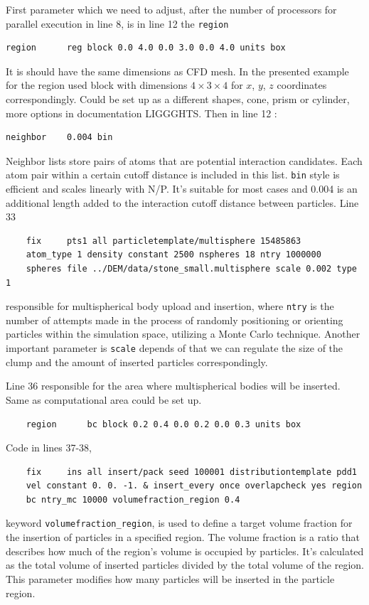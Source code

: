 First parameter which we need to adjust, after the number of processors for parallel execution in line 8, is in line 12 the  \texttt{region}
\begin{verbatim}
region		reg block 0.0 4.0 0.0 3.0 0.0 4.0 units box
\end{verbatim}
It is should have the same dimensions as CFD mesh. In the presented example for the region used block with dimensions $4 \times 3 \times 4$ for $x$, $y$, $z$ coordinates correspondingly. Could be set up as a different shapes, cone, prism or cylinder, more options in documentation LIGGGHTS. Then in line 12 :
\begin{verbatim}
neighbor	0.004 bin
\end{verbatim}
Neighbor lists store pairs of atoms that are potential interaction candidates. Each atom pair within a certain cutoff distance is included in this list. \texttt{bin} style is efficient and scales linearly with N/P. It's suitable for most cases and 0.004 is an additional length added to the interaction cutoff distance between particles. Line 33 
\begin{verbatim}
    fix		pts1 all particletemplate/multisphere 15485863 
    atom_type 1 density constant 2500 nspheres 18 ntry 1000000
    spheres file ../DEM/data/stone_small.multisphere scale 0.002 type 1
\end{verbatim}
responsible for multispherical body upload and insertion, where \verb|ntry| is the number of attempts made in the process of randomly positioning or orienting particles within the simulation space, utilizing a Monte Carlo technique. Another important parameter is \verb|scale| depends of that we can regulate the size of the clump and the amount of inserted particles correspondingly. 

Line 36 responsible for the area where multispherical bodies will be inserted. Same as computational area could be set up.
\begin{verbatim}
    region		bc block 0.2 0.4 0.0 0.2 0.0 0.3 units box
\end{verbatim}
Code in lines 37-38,
\begin{verbatim}
    fix		ins all insert/pack seed 100001 distributiontemplate pdd1
    vel constant 0. 0. -1. & insert_every once overlapcheck yes region 
    bc ntry_mc 10000 volumefraction_region 0.4
\end{verbatim}
keyword \texttt{volumefraction\_region}, is used to define a target volume fraction for the insertion of particles in a specified region. The volume fraction is a ratio that describes how much of the region's volume is occupied by particles. It's calculated as the total volume of inserted particles divided by the total volume of the region. This parameter modifies how many particles will be inserted in the particle region.

